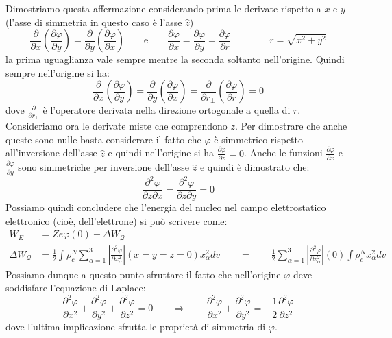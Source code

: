 Dimostriamo questa affermazione considerando prima le derivate rispetto a $x$ e
$y$ (l'asse di simmetria in questo caso è l'asse $\hat{z}$)
\begin{equation}
\frac{\partial}{\partial x} \left( \frac{\partial \varphi}{\partial y} \right) 
= \frac{\partial}{\partial y} \left( \frac{\partial \varphi}{\partial x} 
\right) \qquad \text{e} \qquad \frac{\partial \varphi}{\partial x} = 
\frac{\partial \varphi}{\partial y} = \frac{\partial \varphi}{\partial r} 
\qquad \qquad r = \sqrt{x^2 + y^2}
\end{equation}
la prima uguaglianza vale sempre mentre la seconda soltanto nell'origine. 
Quindi sempre nell'origine si ha:
\begin{equation}
\frac{\partial}{\partial x} \left( \frac{\partial \varphi}{\partial y} \right) 
= \frac{\partial}{\partial y} \left( \frac{\partial \varphi}{\partial x} 
\right) = \frac{\partial}{\partial r_{\perp}} \left( \frac{\partial 
\varphi}{\partial r} \right) = 0
\end{equation}
dove $\frac{\partial}{\partial r_{\perp}}$ è l'operatore derivata nella
direzione ortogonale a quella di $r$. Consideriamo ora le derivate miste che
comprendono $z$. Per dimostrare che anche queste sono nulle basta considerare il
fatto che $\varphi$ è simmetrico rispetto all'inversione dell'asse $\hat{z}$ e
quindi nell'origine si ha $\frac{\partial \varphi}{\partial z} = 0$. Anche le
funzioni $\frac{\partial \varphi}{\partial x}$ e $\frac{\partial
\varphi}{\partial y}$ sono simmetriche per inversione dell'asse $\hat{z}$ e
quindi è dimostrato che:
\begin{equation}
\frac{\partial^2 \varphi}{\partial z \partial x} = \frac{\partial^2 
\varphi}{\partial z \partial y} = 0
\end{equation}
Possiamo quindi concludere che l'energia del nucleo nel campo elettrostatico
elettronico (cioè, dell'elettrone) si può scrivere come:
\begin{equation}
\begin{split}
W_E &= Z e \varphi{(0)} + \Delta W_{\mathcal{Q}}\\
\Delta W_{\mathcal{Q}} &= \frac{1}{2} \int \rho_c^N \sum_{\alpha = 1}^3 \left| 
\frac{\partial^2 \varphi}{\partial x_{\alpha}^2} \right|{(x=y=z=0)}  
x_{\alpha}^2 dv \qquad = \qquad \frac{1}{2} \sum_{\alpha=1}^3 \left| 
\frac{\partial^2 \varphi}{\partial x_{\alpha}^2} \right|{(0)} \int \rho_c^N  
x_{\alpha}^2 dv
\end{split}
\end{equation}
Possiamo dunque a questo punto sfruttare il fatto che nell'origine $\varphi$
deve soddisfare l'equazione di Laplace:
\begin{equation}
\frac{\partial^2 \varphi}{\partial x^2} + \frac{\partial^2 \varphi}{\partial 
y^2} + \frac{\partial^2 \varphi}{\partial z^2} = 0 \qquad \Rightarrow \qquad 
\frac{\partial^2 \varphi}{\partial x^2} + \frac{\partial^2 \varphi}{\partial 
y^2} = -\frac{1}{2} \frac{\partial^2 \varphi}{\partial z^2}
\end{equation}
dove l'ultima implicazione sfrutta le proprietà di simmetria di $\varphi$.

